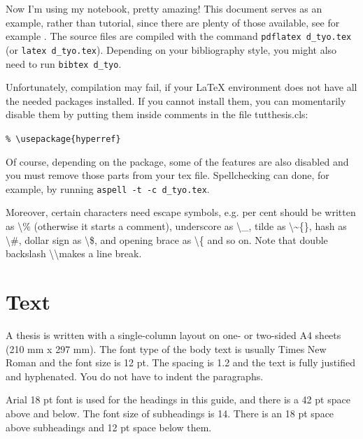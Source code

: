 \documentclass[12pt,a4paper,finnish]{tutthesis}
\begin{document}
Now I'm using my notebook, pretty amazing!
This document serves as an example, rather than tutorial, since there
are plenty of those available, see for example 
\cite{mittelbach04,oetiker14, latex13}. The source files are compiled
with the command \texttt{pdflatex d\_tyo.tex} (or \texttt{latex
  d\_tyo.tex}). Depending on your bibliography style, you might also
need to run \texttt{bibtex d\_tyo}.

Unfortunately, compilation may fail, if your LaTeX environment does
not have all the needed packages installed. If you cannot install
them, you can momentarily disable them by putting them inside comments
in the file tutthesis.cls:
\begin{center}
\texttt{\% \textbackslash usepackage\{hyperref\}}
\end{center}
Of course, depending on the package, some of the features are also
disabled and you must remove those parts from your tex file.
Spellchecking can done, for example, by running 
\texttt{aspell -t -c d\_tyo.tex}.

Moreover, certain characters need escape symbols, e.g. per cent should
be written as \textbackslash\% (otherwise it starts a comment),
underscore as \textbackslash\_, tilde as \textbackslash\~{}\{\}, hash
as \textbackslash\#, dollar sign as \textbackslash\$, and opening
brace as \textbackslash\{ and so on. Note that double backslash
\textbackslash\textbackslash makes a line break.

\section{Text}
A thesis is written with a single-column layout on one- or two-sided
A4 sheets (210 mm x 297 mm). The font type of the body text is usually
Times New Roman and the font size is 12 pt. The spacing is 1.2 and the
text is fully justified and hyphenated. You do not have to indent the
paragraphs.

Arial 18 pt font is used for the headings in this guide, and there is
a 42 pt space above and below. The font size of subheadings is
14. There is an 18 pt space above subheadings and 12 pt space below
them.
\end{document}
